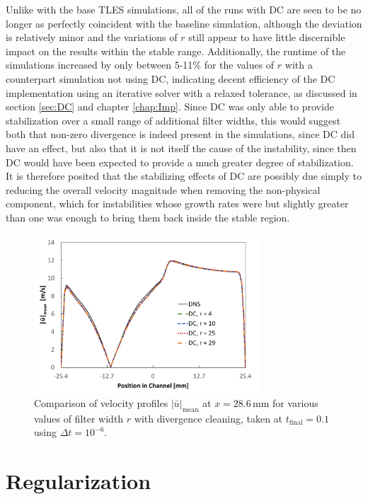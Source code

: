 Unlike with the base TLES simulations, all of the runs with DC are seen to be no longer as perfectly coincident with the baseline simulation, although the deviation is relatively minor and the variations of $r$ still appear to have little discernible impact on the results within the stable range. Additionally, the runtime of the simulations increased by only between 5-11\% for the values of $r$ with a counterpart simulation not using DC, indicating decent efficiency of the DC implementation using an iterative solver with a relaxed tolerance, as discussed in section \ref{sec:DC} and chapter \ref{chap:Imp}. Since DC was only able to provide stabilization over a small range of additional filter widths, this would suggest both that non-zero divergence is indeed present in the simulations, since DC did have an effect, but also that it is not itself the cause of the instability, since then DC would have been expected to provide a much greater degree of stabilization. It is therefore posited that the stabilizing effects of DC are possibly due simply to reducing the overall velocity magnitude when removing the non-physical component, which for instabilities whose growth rates were but slightly greater than one was enough to bring them back inside the stable region.

\begin{figure}[!tb]
\centering
\includegraphics[width=0.75\textwidth]{figures/line_data_DC.pdf}
\caption{Comparison of velocity profiles $|\bar{u}|_{\mathrm{mean}}$ at $x=28.6\,\mathrm{mm}$ for various values of filter width $r$ with divergence cleaning, taken at $t_\mathrm{final}=0.1$ using $\Delta t=10^{-6}$.}
\label{fig:line_data_DC}
\end{figure}

\section{Regularization}

